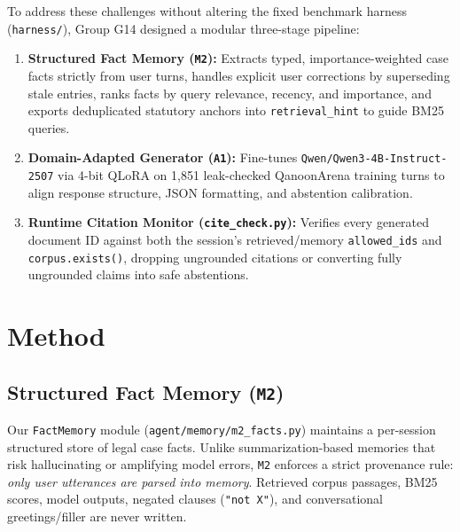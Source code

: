 \documentclass[11pt]{article}
\newcommand{\groupid}{G14}
\begin{document}
To address these challenges without altering the fixed benchmark harness (\texttt{harness/}), Group \groupid{} designed a modular three-stage pipeline:
\begin{enumerate}[leftmargin=*,nosep]
    \item \textbf{Structured Fact Memory (\texttt{M2}):} Extracts typed, importance-weighted case facts strictly from user turns, handles explicit user corrections by superseding stale entries, ranks facts by query relevance, recency, and importance, and exports deduplicated statutory anchors into \texttt{retrieval\_hint} to guide BM25 queries.
    \item \textbf{Domain-Adapted Generator (\texttt{A1}):} Fine-tunes \texttt{Qwen/Qwen3-4B-Instruct-2507} via 4-bit QLoRA on 1,851 leak-checked QanoonArena training turns to align response structure, JSON formatting, and abstention calibration.
    \item \textbf{Runtime Citation Monitor (\texttt{cite\_check.py}):} Verifies every generated document ID against both the session's retrieved/memory \texttt{allowed\_ids} and \texttt{corpus.exists()}, dropping ungrounded citations or converting fully ungrounded claims into safe abstentions.
\end{enumerate}

\section{Method}
\label{sec:\groupid-method}

\subsection{Structured Fact Memory (\texttt{M2})}
Our \texttt{FactMemory} module (\texttt{agent/memory/m2\_facts.py}) maintains a per-session structured store of legal case facts. Unlike summarization-based memories that risk hallucinating or amplifying model errors, \texttt{M2} enforces a strict provenance rule: \emph{only user utterances are parsed into memory}. Retrieved corpus passages, BM25 scores, model outputs, negated clauses (\texttt{"not X"}), and conversational greetings/filler are never written.
\end{document}
